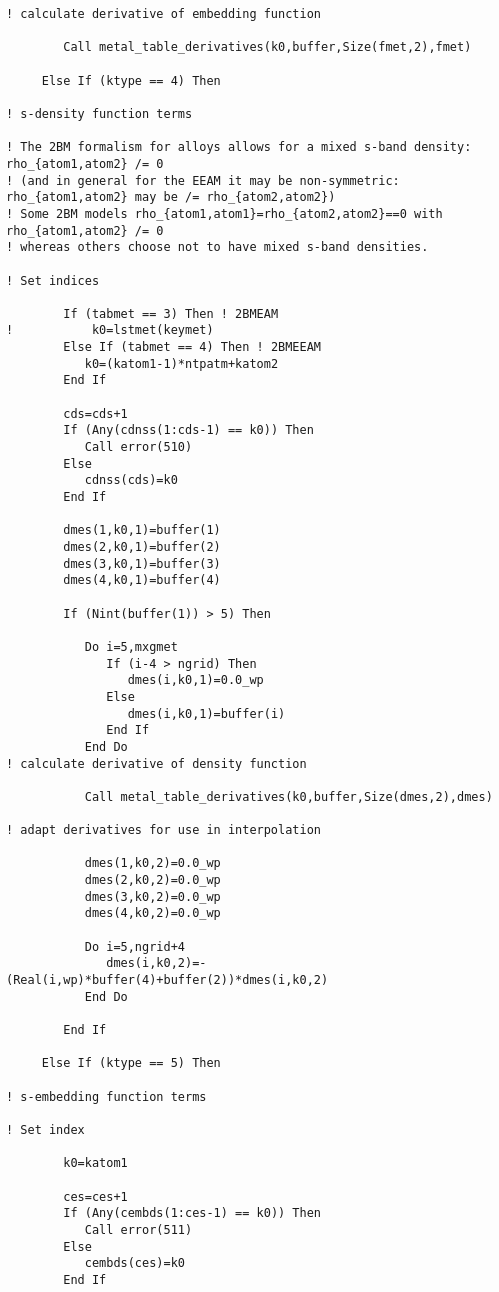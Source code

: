 \begin{lstlisting}[style=sFortran,caption={Add two numbers function}]
! calculate derivative of embedding function

        Call metal_table_derivatives(k0,buffer,Size(fmet,2),fmet)

     Else If (ktype == 4) Then

! s-density function terms

! The 2BM formalism for alloys allows for a mixed s-band density: rho_{atom1,atom2} /= 0
! (and in general for the EEAM it may be non-symmetric: rho_{atom1,atom2} may be /= rho_{atom2,atom2})
! Some 2BM models rho_{atom1,atom1}=rho_{atom2,atom2}==0 with rho_{atom1,atom2} /= 0
! whereas others choose not to have mixed s-band densities.

! Set indices

        If (tabmet == 3) Then ! 2BMEAM
!           k0=lstmet(keymet)
        Else If (tabmet == 4) Then ! 2BMEEAM
           k0=(katom1-1)*ntpatm+katom2
        End If

        cds=cds+1
        If (Any(cdnss(1:cds-1) == k0)) Then
           Call error(510)
        Else
           cdnss(cds)=k0
        End If

        dmes(1,k0,1)=buffer(1)
        dmes(2,k0,1)=buffer(2)
        dmes(3,k0,1)=buffer(3)
        dmes(4,k0,1)=buffer(4)

        If (Nint(buffer(1)) > 5) Then

           Do i=5,mxgmet
              If (i-4 > ngrid) Then
                 dmes(i,k0,1)=0.0_wp
              Else
                 dmes(i,k0,1)=buffer(i)
              End If
           End Do
! calculate derivative of density function

           Call metal_table_derivatives(k0,buffer,Size(dmes,2),dmes)

! adapt derivatives for use in interpolation

           dmes(1,k0,2)=0.0_wp
           dmes(2,k0,2)=0.0_wp
           dmes(3,k0,2)=0.0_wp
           dmes(4,k0,2)=0.0_wp

           Do i=5,ngrid+4
              dmes(i,k0,2)=-(Real(i,wp)*buffer(4)+buffer(2))*dmes(i,k0,2)
           End Do

        End If

     Else If (ktype == 5) Then

! s-embedding function terms

! Set index

        k0=katom1

        ces=ces+1
        If (Any(cembds(1:ces-1) == k0)) Then
           Call error(511)
        Else
           cembds(ces)=k0
        End If


\end{lstlisting}
